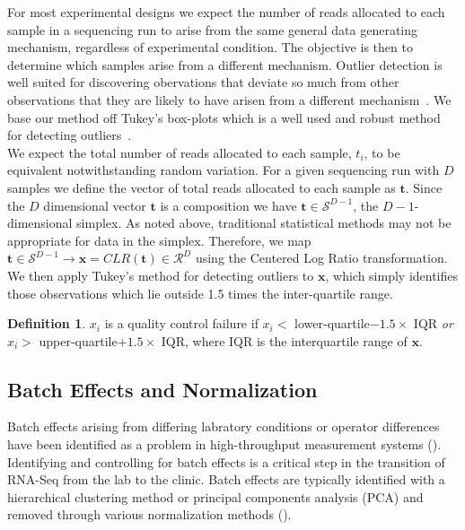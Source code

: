 \documentclass{article}\usepackage[]{graphicx}\usepackage[]{color}
\theoremstyle{definition}
\newtheorem{definition}{Definition}
\begin{document}
For most experimental designs we expect the number of reads allocated to each sample in a sequencing run to arise from the same general data generating mechanism, regardless of experimental condition.  The objective is then to determine which samples arise from a different mechanism.  Outlier detection is well suited for discovering obervations that deviate so much from other observations that they are likely to have arisen from a different mechanism~\cite{Hawkins1980}.  We base our method off Tukey's box-plots\cite{Tukey1977} which is a well used and robust method for detecting outliers~\cite{Ben-Gal2009}.\\

We expect the total number of reads allocated to each sample, $t_i$, to be equivalent notwithstanding random variation. For a given sequencing run with $D$ samples we define the vector of total reads allocated to each sample as $\mathbf{t}$.  Since the $D$ dimensional vector $\mathbf{t}$ is a composition we have $\mathbf{t} \in \mathcal{S}^{D-1}$, the $D-1$-dimensional simplex. As noted above, traditional statistical methods may not be appropriate for data in the simplex.  Therefore, we map $\mathbf{t} \in \mathcal{S}^{D-1} \rightarrow \mathbf{x} = CLR(\mathbf{t}) \in \mathcal{R}^D$ using the Centered Log Ratio transformation.  We then apply Tukey's method for detecting outliers to $\mathbf{x}$, which simply identifies those observations which lie outside 1.5 times the inter-quartile range.

\theoremstyle{definition}
\begin{definition}
$x_i$ is a quality control failure if $x_i <$ lower-quartile$- 1.5 \times$ IQR \emph{or}  $x_i >$ upper-quartile$+ 1.5 \times$ IQR, where IQR is the interquartile range of $\mathbf{x}$.
\end{definition}









\subsection{Batch Effects and Normalization}
Batch effects arising from differing labratory conditions or operator differences have been identified as a problem in high-throughput measurement systems (\cite{leek2010, chen2011}).  Identifying and controlling for batch effects is a critical step in the transition of RNA-Seq from the lab to the clinic.  Batch effects are typically identified with a hierarchical clustering method or principal components analysis (PCA) and removed through various normalization methods (\cite{Robinson2007, Anders2010, Robinson2010, Law2014, leek2014}).  \\ 
\end{document}
